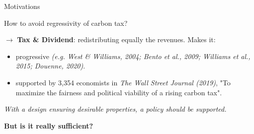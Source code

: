 \documentclass[aspectratio=169,9pt,dvipsnames]{beamer}
\begin{document}


    \begin{frame}{Motivations}

How to avoid regressivity of carbon tax? \vspace{1cm}

$\rightarrow$ \textbf{Tax \& Dividend}: redistributing equally the revenues. Makes it:

\vspace{0.3cm}

\begin{itemize}
    \item progressive \textcolor{teal_dark}{{\small \textit{(e.g. West \& Williams, 2004; Bento et al., 2009; Williams et al., 2015; Douenne, 2020)}}}.
    
    \vspace{0.25cm}
    
    \item supported by 3,354 economists in \textcolor{teal_dark}{{\small \textit{The Wall Street Journal (2019)}}}, "To maximize the fairness and political viability of a rising carbon tax".
\end{itemize}

\vspace{0.4cm}
\pause

\textit{With a design ensuring desirable properties, a policy should be supported.}

\vspace{0.35cm}

\textbf{But is it really sufficient?}

    \end{frame}
\end{document}
